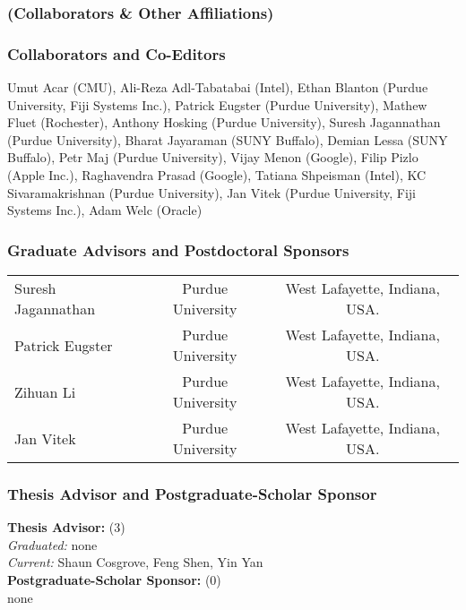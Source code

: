 \documentclass[times,11pt]{article}
\newcommand{\fijisys}{Fiji Systems Inc.}
\begin{document}
\subsubsection*{(Collaborators \& Other Affiliations)}
\subsubsection*{Collaborators and Co-Editors}
\noindent Umut Acar (CMU),
Ali-Reza Adl-Tabatabai (Intel), 
Ethan Blanton (Purdue University, \fijisys),
Patrick Eugster (Purdue University),
Mathew Fluet (Rochester), 
Anthony Hosking (Purdue University),
Suresh Jagannathan (Purdue University),
Bharat Jayaraman (SUNY Buffalo), 
Demian Lessa (SUNY Buffalo),
Petr Maj (Purdue University),
Vijay Menon (Google),
Filip Pizlo (Apple Inc.),
Raghavendra Prasad (Google),
Tatiana Shpeisman (Intel),
KC Sivaramakrishnan (Purdue University),
Jan Vitek (Purdue University, \fijisys),
Adam Welc (Oracle)


\subsubsection*{Graduate Advisors and Postdoctoral Sponsors}
\noindent \begin{tabular}{lcc}
Suresh Jagannathan & Purdue University & West Lafayette, Indiana, USA.\\
Patrick Eugster    & Purdue University & West Lafayette, Indiana, USA.\\
Zihuan Li          & Purdue University & West Lafayette, Indiana, USA.\\
Jan Vitek          & Purdue University & West Lafayette, Indiana, USA.\\
\end{tabular}

\subsubsection*{Thesis Advisor and Postgraduate-Scholar Sponsor}

\textbf{Thesis Advisor:} (3) \\
\emph{Graduated:} none\\
\emph{Current:} Shaun Cosgrove, Feng Shen, Yin Yan\\
\textbf{Postgraduate-Scholar Sponsor:} (0) \\
none
\end{document}
